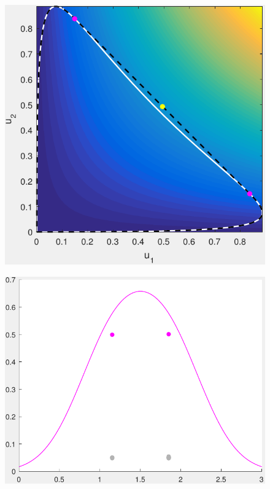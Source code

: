 
		\begin{figure}[ht]
			\centering
			\begin{minipage}{0.4\textwidth}
				\includegraphics[width = \textwidth]{GammaOptimHullSol}
				\subcaption{}\label{fig:GammaSol:subfig:Gamma}
			\end{minipage}
			\begin{minipage}{0.5\textwidth}
				\includegraphics[width = \textwidth]{MixingSolSigma045}				\subcaption{}\label{fig:GammaSol:subfig:Density}

\end{minipage}
\end{figure}
